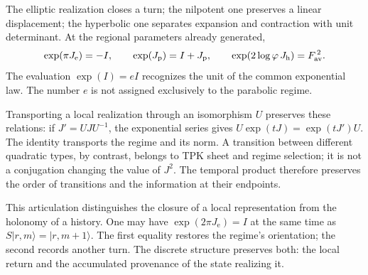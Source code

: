 The elliptic realization closes a turn; the nilpotent one preserves a
linear displacement; the hyperbolic one separates expansion and contraction with
unit determinant. At the regional parameters already generated,
\[
 \exp(\pi J_{\mathrm e})=-I,\qquad
 \exp(J_{\mathrm p})=I+J_{\mathrm p},\qquad
 \exp(2\log\varphi\,J_{\mathrm h})=F_{\rm av}^{\,2}.
\]
The evaluation \(\exp(I)=eI\) recognizes the unit of the common
exponential law. The number \(e\) is not assigned exclusively to the parabolic regime.

Transporting a local realization through an isomorphism \(U\) preserves
these relations: if \(J'=UJU^{-1}\), the exponential series gives
\(U\exp(tJ)=\exp(tJ')U\). The identity transports the regime and its
norm. A transition between different quadratic types, by contrast, belongs
to TPK sheet and regime selection; it is not a conjugation
changing the value of \(J^2\). The temporal product therefore preserves the
order of transitions and the information at their endpoints.

This articulation distinguishes the closure of a local representation from the
holonomy of a history. One may have \(\exp(2\pi J_{\mathrm e})=I\)
at the same time as \(S|r,m\rangle=|r,m+1\rangle\). The first equality
restores the regime's orientation; the second records another turn. The
discrete structure preserves both: the local return and the accumulated
provenance of the state realizing it.
